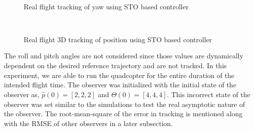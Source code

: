 \documentclass[letterpaper%
, twoside%
, 12pt%
,memoire%
, english%
,creativecommons,hyperref%
]{thETS}
\begin{document}
\begin{figure}[H]
	\centering
	 \\ \parbox{0.75\textwidth}{\caption{Real flight tracking of yaw using STO based controller\label{Fig:yawtracSTODist}}}
\end{figure}
\begin{figure}[H]
	\centering
	 \\ \parbox{0.75\textwidth}{\caption{Real flight 3D tracking of position using STO based controller\label{Fig:3dSTODist}}}
\end{figure}
The roll and pitch angles are not considered since those values are dynamically dependent on the desired reference trajectory and are not tracked. In this experiment, we are able to run the quadcopter for the entire duration of the intended flight time. The observer was initialized with the initial state of the observer as, $\hat{p}(0)=[2,2,2]$ and $\hat{\Theta}(0)=[4,4,4]$. This incorrect state of the observer was set similar to the simulations to test the real asymptotic nature of the observer. The root-mean-square of the error in tracking is mentioned along with the RMSE of other observers in a later subsection.
\end{document}
